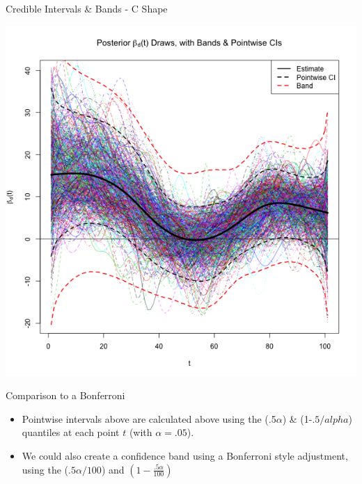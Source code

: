 \documentclass[9 pt]{beamer}
\newcommand{\bi}{\begin{itemize}}
\newcommand{\ei}{\end{itemize}}
\newcommand{\ilist}[1]{\bi \item #1 \ei}
\begin{document}
\begin{frame}{Credible Intervals \& Bands - C Shape}

\begin{center}

\includegraphics[scale=.37]{pics/Figure_Bands_C_Shape_12-19-12_Nobonf.png}

\end{center}
\end{frame}



\begin{frame}{Comparison to a Bonferroni}

\bi
\item Pointwise intervals above are calculated above using the (.5$\alpha$) \& (1-$.5/alpha$) quantiles at each point $t$ (with $\alpha= .05$).
\item We could also create a confidence band using a Bonferroni style adjustment, using the ($.5\alpha/100$) and $(1- \frac{.5\alpha}{ 100})$
\ei



\end{frame}
\end{document}

